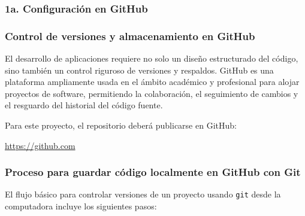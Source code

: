 \newpage
\subsubsection{1a. Configuración en GitHub}

\subsubsection*{Control de versiones y almacenamiento en GitHub}

El desarrollo de aplicaciones requiere no solo un diseño estructurado del código, sino también un control riguroso de versiones y respaldos. GitHub es una plataforma ampliamente usada en el ámbito académico y profesional para alojar proyectos de software, permitiendo la colaboración, el seguimiento de cambios y el resguardo del historial del código fuente. 

Para este proyecto, el repositorio deberá publicarse en GitHub:
\begin{center}
\url{https://github.com}
\end{center}

\subsubsection*{Proceso para guardar código localmente en GitHub con Git}

El flujo básico para controlar versiones de un proyecto usando \texttt{git} desde la computadora incluye los siguientes pasos:

